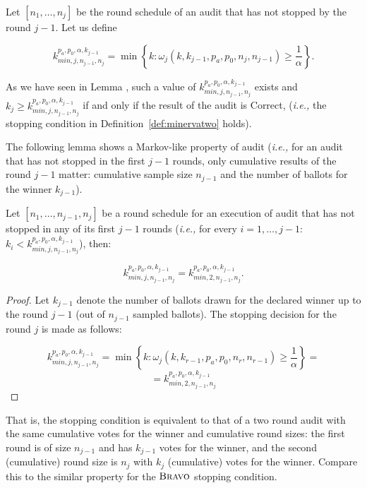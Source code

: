 \begin{definition} 
\label{def:kmin}
Let $[n_1, \ldots, n_j]$ be the round schedule of an audit that has not stopped by the round $j-1$. Let us define 
\begin{small}
\begin{equation}\label{eq:kMin}
k^{p_a, p_0, \alpha, k_{j-1}}_{min, j, n_{j-1}, n_j}  =
  \min\left\{k : \omega_j(k, k_{j-1},p_a,p_0,n_j, n_{j-1}) \geq \frac{1}{\alpha}  \right\}.
\end{equation}
\end{small}
\end{definition}
As we have seen in Lemma \label{lemma:minerva2_kmin_exists}, such a value of $k^{p_a, p_0, \alpha, k_{j-1}}_{min, j, n_{j-1}, n_j}$ exists and $k_j \geq k^{p_a, p_0, \alpha, k_{j-1}}_{min, j, n_{j-1}, n_j} $ if and only if the result of the audit is Correct, (\textit{i.e.,} the stopping condition in Definition~\ref{def:minervatwo} holds).

The following lemma shows a Markov-like property of \Providence audit (\textit{i.e.,}
for an audit that has not stopped in the first $j-1$ rounds, only cumulative results of the round $j-1$ matter: cumulative sample size $n_{j-1}$ and the number of ballots for the winner $k_{j-1}$).

\begin{lemma}\label{lemma:markov}
Let $[n_1, \ldots, n_{j-1}, n_j]$ be a round schedule for an execution of  \Providence audit that has not stopped
in any of its first $j-1$ rounds (\textit{i.e.,} for every $i = 1, \ldots, j-1$:
$k_i < k^{p_a, p_0, \alpha, k_{j-1}}_{min, j, n_{j-1}, n_j} $), then: 

\[ 
k^{p_a, p_0, \alpha, k_{j-1}}_{min, j, n_{j-1}, n_j} = k^{p_a, p_0, \alpha, k_{j-1}}_{min, 2, n_{j-1}, n_j} .
\]
\end{lemma}
\begin{proof}
Let $k_{j-1}$ denote the number of ballots drawn for the declared winner up to the round $j-1$ (out of $n_{j-1}$ sampled ballots). The stopping decision for the round $j$ is made as follows:

\[
 k^{p_a, p_0, \alpha, k_{j-1}}_{min, j, n_{j-1}, n_j}  = \min\left\{k : \omega_{j}(k, k_{r-1}, p_a, p_0, n_r, n_{r-1}) \geq \frac{1}{\alpha}  \right\} = 
\]
\[
  =  k^{p_a, p_0, \alpha, k_{j-1}}_{min, 2, n_{j-1}, n_j}  
\]

\end{proof}

That is, the stopping condition is equivalent to that of a two round audit with the same cumulative votes for the winner and cumulative round sizes: the first round is of size $n_{j-1}$ and has $k_{j-1}$ votes for the winner, and the second (cumulative) round size is $n_j$ with $k_j$ (cumulative) votes for the winner. Compare this to the similar property for the $\textsc{Bravo}$ stopping condition. 
